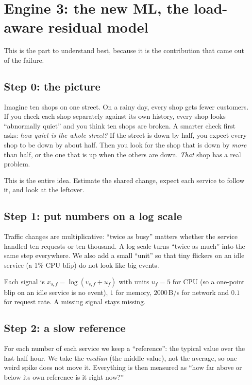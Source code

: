 \section{Engine 3: the new ML, the load-aware residual model}
\label{sec:loadmodel}
This is the part to understand best, because it is the contribution that came out of the failure.

\subsection{Step 0: the picture}
\begin{simplebox}
Imagine ten shops on one street. On a rainy day, every shop gets fewer customers. If you check each shop separately against its own history, every shop looks ``abnormally quiet'' and you think ten shops are broken. A smarter check first asks: \emph{how quiet is the whole street?} If the street is down by half, you expect every shop to be down by about half. Then you look for the shop that is down by \emph{more} than half, or the one that is up when the others are down. \emph{That} shop has a real problem.

This is the entire idea. Estimate the shared change, expect each service to follow it, and look at the leftover.
\end{simplebox}

\subsection{Step 1: put numbers on a log scale}
\begin{simplebox}
Traffic changes are multiplicative: ``twice as busy'' matters whether the service handled ten requests or ten thousand. A log scale turns ``twice as much'' into the same step everywhere. We also add a small ``unit'' so that tiny flickers on an idle service (a 1\% CPU blip) do not look like big events.
\end{simplebox}

\begin{techbox}
Each signal is $x_{s,f}=\log(v_{s,f}+u_f)$ with units $u_f=5$ for CPU (so a one-point blip on an idle service is no event), $1$ for memory, $2000$\,B/s for network and $0.1$ for request rate. A missing signal stays missing.
\end{techbox}

\subsection{Step 2: a slow reference}
\begin{simplebox}
For each number of each service we keep a ``reference'': the typical value over the last half hour. We take the \emph{median} (the middle value), not the average, so one weird spike does not move it. Everything is then measured as ``how far above or below its own reference is it right now?''
\end{simplebox}


